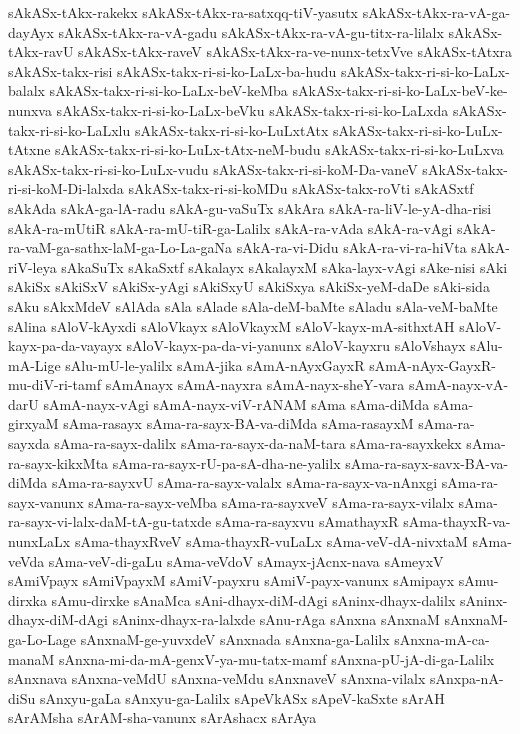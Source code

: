 {sAkASx-tAkx-rakekx
sAkASx-tAkx-ra-satxqq-tiV-yasutx
sAkASx-tAkx-ra-vA-ga-dayAyx
sAkASx-tAkx-ra-vA-gadu
sAkASx-tAkx-ra-vA-gu-titx-ra-lilalx
sAkASx-tAkx-ravU
sAkASx-tAkx-raveV
sAkASx-tAkx-ra-ve-nunx-tetxVve
sAkASx-tAtxra
sAkASx-takx-risi
sAkASx-takx-ri-si-ko-LaLx-ba-hudu
sAkASx-takx-ri-si-ko-LaLx-balalx
sAkASx-takx-ri-si-ko-LaLx-beV-keMba
sAkASx-takx-ri-si-ko-LaLx-beV-ke-nunxva
sAkASx-takx-ri-si-ko-LaLx-beVku
sAkASx-takx-ri-si-ko-LaLxda
sAkASx-takx-ri-si-ko-LaLxlu
sAkASx-takx-ri-si-ko-LuLxtAtx
sAkASx-takx-ri-si-ko-LuLx-tAtxne
sAkASx-takx-ri-si-ko-LuLx-tAtx-neM-budu
sAkASx-takx-ri-si-ko-LuLxva
sAkASx-takx-ri-si-ko-LuLx-vudu
sAkASx-takx-ri-si-koM-Da-vaneV
sAkASx-takx-ri-si-koM-Di-lalxda
sAkASx-takx-ri-si-koMDu
sAkASx-takx-roVti
sAkASxtf
sAkAda
sAkA-ga-lA-radu
sAkA-gu-vaSuTx
sAkAra
sAkA-ra-liV-le-yA-dha-risi
sAkA-ra-mUtiR
sAkA-ra-mU-tiR-ga-Lalilx
sAkA-ra-vAda
sAkA-ra-vAgi
sAkA-ra-vaM-ga-sathx-laM-ga-Lo-La-gaNa
sAkA-ra-vi-Didu
sAkA-ra-vi-ra-hiVta
sAkA-riV-leya
sAkaSuTx
sAkaSxtf
sAkalayx
sAkalayxM
sAka-layx-vAgi
sAke-nisi
sAki
sAkiSx
sAkiSxV
sAkiSx-yAgi
sAkiSxyU
sAkiSxya
sAkiSx-yeM-daDe
sAki-sida
sAku
sAkxMdeV
sAlAda
sAla
sAlade
sAla-deM-baMte
sAladu
sAla-veM-baMte
sAlina
sAloV-kAyxdi
sAloVkayx
sAloVkayxM
sAloV-kayx-mA-sithxtAH
sAloV-kayx-pa-da-vayayx
sAloV-kayx-pa-da-vi-yanunx
sAloV-kayxru
sAloVshayx
sAlu-mA-Lige
sAlu-mU-le-yalilx
sAmA-jika
sAmA-nAyxGayxR
sAmA-nAyx-GayxR-mu-diV-ri-tamf
sAmAnayx
sAmA-nayxra
sAmA-nayx-sheY-vara
sAmA-nayx-vA-darU
sAmA-nayx-vAgi
sAmA-nayx-viV-rANAM
sAma
sAma-diMda
sAma-girxyaM
sAma-rasayx
sAma-ra-sayx-BA-va-diMda
sAma-rasayxM
sAma-ra-sayxda
sAma-ra-sayx-dalilx
sAma-ra-sayx-da-naM-tara
sAma-ra-sayxkekx
sAma-ra-sayx-kikxMta
sAma-ra-sayx-rU-pa-sA-dha-ne-yalilx
sAma-ra-sayx-savx-BA-va-diMda
sAma-ra-sayxvU
sAma-ra-sayx-valalx
sAma-ra-sayx-va-nAnxgi
sAma-ra-sayx-vanunx
sAma-ra-sayx-veMba
sAma-ra-sayxveV
sAma-ra-sayx-vilalx
sAma-ra-sayx-vi-lalx-daM-tA-gu-tatxde
sAma-ra-sayxvu
sAmathayxR
sAma-thayxR-va-nunxLaLx
sAma-thayxRveV
sAma-thayxR-vuLaLx
sAma-veV-dA-nivxtaM
sAma-veVda
sAma-veV-di-gaLu
sAma-veVdoV
sAmayx-jAcnx-nava
sAmeyxV
sAmiVpayx
sAmiVpayxM
sAmiV-payxru
sAmiV-payx-vanunx
sAmipayx
sAmu-dirxka
sAmu-dirxke
sAnaMca
sAni-dhayx-diM-dAgi
sAninx-dhayx-dalilx
sAninx-dhayx-diM-dAgi
sAninx-dhayx-ra-lalxde
sAnu-rAga
sAnxna
sAnxnaM
sAnxnaM-ga-Lo-Lage
sAnxnaM-ge-yuvxdeV
sAnxnada
sAnxna-ga-Lalilx
sAnxna-mA-ca-manaM
sAnxna-mi-da-mA-genxV-ya-mu-tatx-mamf
sAnxna-pU-jA-di-ga-Lalilx
sAnxnava
sAnxna-veMdU
sAnxna-veMdu
sAnxnaveV
sAnxna-vilalx
sAnxpa-nA-diSu
sAnxyu-gaLa
sAnxyu-ga-Lalilx
sApeVkASx
sApeV-kaSxte
sArAH
sArAMsha
sArAM-sha-vanunx
sArAshacx
sArAya
}
